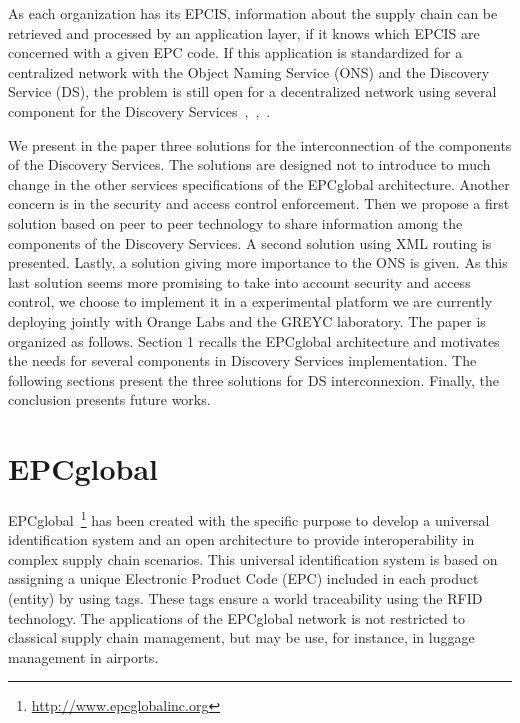 \documentclass[a4paper]{llncs}
\begin{document}
As each organization has its EPCIS, information about the supply chain can be retrieved and
processed by an application layer, if it knows which EPCIS are concerned with a given EPC code. If
this application is standardized for a centralized network with the Object Naming Service (ONS) and
the Discovery Service (DS), the problem is still open for a decentralized network using several
component for the Discovery Services~\cite{BRIDGE},~\cite{dsdesign},~\cite{tracabilityDS}.  

We present in the paper three solutions for the interconnection of the components of the Discovery
Services. The solutions are designed not to introduce to much change in the other services
specifications of the EPCglobal architecture. Another concern is in the security and access control
enforcement. Then we propose a first solution based on peer to peer technology to share information
among the components of the Discovery Services. A second solution using XML routing is presented.
Lastly, a solution giving more importance to the ONS is given. As this last solution seems more
promising to take into account security and access control, we choose to implement it in a
experimental platform we are currently deploying jointly with Orange Labs and the GREYC laboratory.
The paper is organized as follows. Section 1 recalls the EPCglobal
architecture and motivates the needs for several components in Discovery Services implementation.
The following sections present the three solutions for DS interconnexion. Finally, the conclusion
presents future works.

\section{EPCglobal}


EPCglobal~\footnote{\url{http://www.epcglobalinc.org}} has been created with the specific purpose to
develop a universal identification system and an open architecture to provide interoperability in
complex supply chain scenarios. This universal identification system is based on assigning a unique
Electronic Product Code (EPC) included in each product (entity) by using tags. These tags ensure a
world traceability using the RFID technology. The applications of the EPCglobal network is not
restricted to classical supply chain management, but may be use, for instance, in luggage management
in airports.
\end{document}
